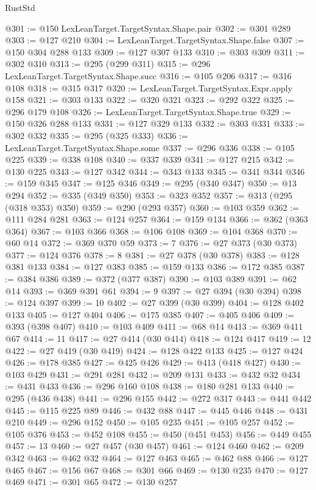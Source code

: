 \begin{lexlean}{RustStd}
\begin{coremodule}
@301 := @150 LexLeanTarget.TargetSyntax.Shape.pair
@302 := @301 @289
@303 := @127 @210
@304 := LexLeanTarget.TargetSyntax.Shape.false
@307 := @150 @304 @288 @133
@309 := @127 @307 @133
@310 := @303 @309
@311 := @302 @310
@313 := @295 (@299 @311)
@315 := @296 LexLeanTarget.TargetSyntax.Shape.succ
@316 := @105 @206
@317 := @316 @108
@318 := @315 @317
@320 := LexLeanTarget.TargetSyntax.Expr.apply @158
@321 := @303 @133
@322 := @320 @321
@323 := @292 @322
@325 := @296 @179 @108
@326 := LexLeanTarget.TargetSyntax.Shape.true
@329 := @150 @326 @288 @133
@331 := @127 @329 @133
@332 := @303 @331
@333 := @302 @332
@335 := @295 (@325 @333)
@336 := LexLeanTarget.TargetSyntax.Shape.some
@337 := @296 @336
@338 := @105 @225
@339 := @338 @108
@340 := @337 @339
@341 := @127 @215
@342 := @130 @225
@343 := @127 @342
@344 := @343 @133
@345 := @341 @344
@346 := @159 @345
@347 := @125 @346
@349 := @295 (@340 @347)
@350 := @13 @294
@352 := @335 (@349 @350)
@353 := @323 @352
@357 := @313 (@295 (@318 @353) @350)
@359 := @290 (@293 @357)
@360 := @103 @359
@362 := @111 @284 @281
@363 := @124 @257
@364 := @159 @134
@366 := @362 (@363 @364)
@367 := @103 @366
@368 := @106 @108
@369 := @104 @368
@370 := @60 @14
@372 := @369 @370 @59
@373 := 7
@376 := @27 @373 (@30 @373)
@377 := @124 @376
@378 := 8
@381 := @27 @378 (@30 @378)
@383 := @128 @381 @133
@384 := @127 @383
@385 := @159 @133
@386 := @172 @385
@387 := @384 @386
@389 := @372 (@377 @387)
@390 := @103 @389
@391 := @62 @14
@393 := @369 @391 @61
@394 := 9
@397 := @27 @394 (@30 @394)
@398 := @124 @397
@399 := 10
@402 := @27 @399 (@30 @399)
@404 := @128 @402 @133
@405 := @127 @404
@406 := @175 @385
@407 := @405 @406
@409 := @393 (@398 @407)
@410 := @103 @409
@411 := @68 @14
@413 := @369 @411 @67
@414 := 11
@417 := @27 @414 (@30 @414)
@418 := @124 @417
@419 := 12
@422 := @27 @419 (@30 @419)
@424 := @128 @422 @133
@425 := @127 @424
@426 := @178 @385
@427 := @425 @426
@429 := @413 (@418 @427)
@430 := @103 @429
@431 := @291 @281
@432 := @209 @131
@433 := @432 @32
@434 := @431 @433
@436 := @296 @160 @108
@438 := @180 @281 @133
@440 := @295 (@436 @438)
@441 := @296 @155
@442 := @272 @317
@443 := @441 @442
@445 := @115 @225 @89
@446 := @432 @88
@447 := @445 @446
@448 := @431 @210
@449 := @296 @152
@450 := @105 @235
@451 := @105 @257
@452 := @105 @376
@453 := @452 @108
@455 := @450 (@451 @453)
@456 := @449 @455
@457 := 13
@460 := @27 @457 (@30 @457)
@461 := @124 @460
@462 := @209 @342
@463 := @462 @32
@464 := @127 @463
@465 := @462 @88
@466 := @127 @465
@467 := @156 @67
@468 := @301 @66
@469 := @130 @235
@470 := @127 @469
@471 := @301 @65
@472 := @130 @257

\end{coremodule}
\end{lexlean}

